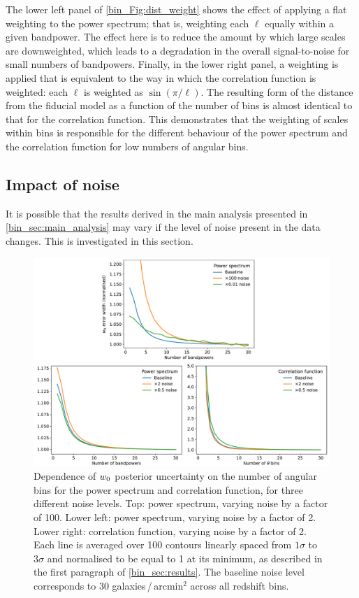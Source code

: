 The lower left panel of \autoref{bin_Fig:dist_weight} shows the effect of applying a flat weighting to the power spectrum; that is, weighting each $\ell$ equally within a given bandpower. The effect here is to reduce the amount by which large scales are downweighted, which leads to a degradation in the overall signal-to-noise for small numbers of bandpowers. Finally, in the lower right panel, a weighting is applied that is equivalent to the way in which the correlation function is weighted: each $\ell$ is weighted as $\sin{\left( \pi / \ell \right)}$. The resulting form of the distance from the fiducial model as a function of the number of bins is almost identical to that for the correlation function. This demonstrates that the weighting of scales within bins is responsible for the different behaviour of the power spectrum and the correlation function for low numbers of angular bins.

\subsection{Impact of noise}
\label{bin_Sec:noise}

It is possible that the results derived in the main analysis presented in \autoref{bin_sec:main_analysis} may vary if the level of noise present in the data changes. This is investigated in this section.

\begin{figure}[tp]
\includegraphics[width=\textwidth]{width_vs_noise}
\caption{Dependence of $w_0$ posterior uncertainty on the number of angular bins for the power spectrum and correlation function, for three different noise levels. Top: power spectrum, varying noise by a factor of 100. Lower left: power spectrum, varying noise by a factor of 2. Lower right: correlation function, varying noise by a factor of 2. Each line is averaged over 100 contours linearly spaced from $1\sigma$ to $3\sigma$ and normalised to be equal to 1 at its minimum, as described in the first paragraph of \autoref{bin_sec:results}. The baseline noise level corresponds to 30 galaxies\,/\,arcmin${}^2$ across all redshift bins.}
\label{bin_Fig:width_vs_noise}
\end{figure}

